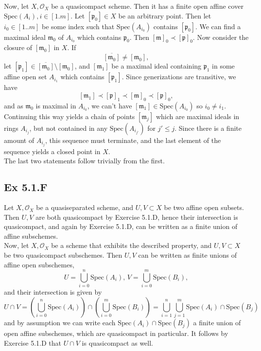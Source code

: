\documentclass{article}
\theoremstyle{definition}
\newcommand{\oo}{\mathcal{O}}
\newcommand{\Spec}{\text{Spec}}
\begin{document}
Now, let $X, \mathcal{O}_X$ be a quasicompact scheme. Then it has a finite open
affine cover $\Spec(A_i), i \in [1.m]$. Let $[\mathfrak{p}_0] \in X$ be an
arbitrary point. Then let $i_0 \in [1..m]$ be some index such that
$\Spec(A_{i_0})$ contains $[\mathfrak{p}_0]$. We can find a maximal ideal
$\mathfrak{m}_0$ of $A_{i_0}$ which contains $\mathfrak{p}_0$. Then
$[\mathfrak{m}]_0 \prec [\mathfrak{p}]_0$. Now consider the closure of
$[\mathfrak{m}_0]$ in $X$. If 
\[
	\overline{[\mathfrak{m}_0]} \not = [\mathfrak{m}_0],
\] 
let $[\mathfrak{p}_1] \in \overline{[\mathfrak{m}_0]} \setminus
[\mathfrak{m}_0]$, and $[\mathfrak{m}_1]$ be a maximal ideal containing
$\mathfrak{p}_1$ in some affine open set $A_{i_1}$ which contains
$[\mathfrak{p}_1]$. Since generizations are transitive, we have
\[
	[\mathfrak{m}_1] \prec [\mathfrak{p}]_1 \prec [\mathfrak{m}]_0 \prec [\mathfrak{p}]_0,
\]
and as $\mathfrak{m}_0$ is maximal in $A_{i_0}$, we can't have
$[\mathfrak{m}_1] \in \Spec(A_{i_0})$ so $i_0 \not = i_1$. Continuing this way
yields a chain of points $[\mathfrak{m}_{j}]$ which are maximal ideals in rings
$A_{i_j}$, but not contained in any $\Spec(A_{i_{j'}})$ for $j' \le j$. Since
there is a finite amount of $A_{i_j}$, this sequence must terminate, and the
last element of the sequence yields a closed point in $X$. \\

The last two statements follow trivially from the first.

\subsection*{Ex 5.1.F}

Let $X, \mathcal{O}_X$ be a quasiseparated scheme, and $U, V \subset X$ be two
affine open subsets. Then $U, V$ are both quasicompact by Exercise 5.1.D, hence
their intersection is quasicompact, and again by Exercise 5.1.D, can be written
as a finite union of affine subschemes. \\

Now, let $X, \oo_{X}$ be a scheme that exhibits the described property, and $U,
V \subset X$ be two quasicompact subschemes. Then $U, V$ can be written as
finite unions of affine open subschemes,
\[
	U = \bigcup_{i=0}^{n} \Spec(A_i),\, 
	V = \bigcup_{i=0}^{m} \Spec(B_i),
\] 
and their intersection is given by
\[
	U \cap V 
	= 
	\left(\bigcup_{i=0}^{n} \Spec(A_i)\right)
	\cap
	\left(\bigcup_{i=0}^{m} \Spec(B_i)\right)
	=
	\bigcup_{i = 1}^{n}
	\bigcup_{j = 1}^{m}
	\Spec(A_i) \cap \Spec(B_j)
\] 
and by assumption we can write each $\Spec(A_i) \cap \Spec(B_j)$ a finite union
of open affine subschemes, which are quasicompact in particular. It follows by
Exercise 5.1.D that $U \cap V$ is quasicompact as well.
\end{document}
